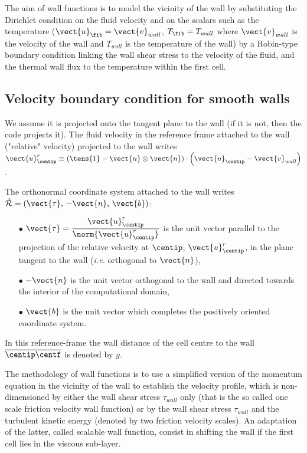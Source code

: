 The aim of wall functions is to model the vicinity of the wall by substituting the Dirichlet condition on the fluid velocity and on the scalars such as the temperature ($\vect{u}_\fib = \vect{v}_{wall}$, $T_\fib = T_{wall}$ where $\vect{v}_{wall}$ is the velocity of the wall and $T_{wall}$ is the temperature of the wall) by a Robin-type boundary condition linking the wall shear stress to the velocity of the fluid, and the 
thermal wall flux to the temperature within the first cell.

\subsection{Velocity boundary condition for smooth walls}
We assume it is projected onto the tangent plane to the wall (if it is not, then the code projects it).
The fluid velocity in the reference frame attached to the wall ("relative" velocity) projected to the wall writes 
$\vect{u}^r _\centip \equiv \left(\tens{1} - \vect{n} \otimes \vect{n} \right)\cdot \left( \vect{u}_\centip - \vect{v}_{wall} \right)$.

The orthonormal coordinate system attached to the wall writes 
$\hat {\mathcal R}=(\vect{\tau}, \, -\vect{n}, \, \vect{b})$:
%
\begin{itemize}
\item [$\bullet$] $\vect{\tau} = \displaystyle\frac{ \vect{u}^r_{\centip} }{ \norm{ \vect{u}^r_{\centip} }}$ is the unit vector parallel to the projection of the relative velocity at $\centip$, $\vect{u}^r_{\centip}$, in the plane tangent to the wall  
 (\emph{i.e.} orthogonal to $\vect{n}$),
\item [$\bullet$] $-\vect{n}$ is the unit vector orthogonal to the wall and directed towards the interior of the computational domain,
\item[$\bullet$] $\vect{b}$ is the unit vector which completes the positively oriented coordinate system.
\end{itemize}
In this reference-frame the wall distance of the cell centre to the wall $\overline{\centip \centf}$ is denoted by $y$.


The methodology of wall functions is to use a simplified version of the momentum equation in the vicinity of the wall to establish 
the velocity profile, which is non-dimensioned by either the wall shear stress $\tau_{wall}$ only (that is the so called one scale friction velocity wall function)
or by the wall shear stress $\tau_{wall}$ and the turbulent kinetic energy (denoted by two friction velocity scales). An adaptation of the latter, called scalable wall function, consist in shifting the wall if the first cell lies in the viscous sub-layer.


